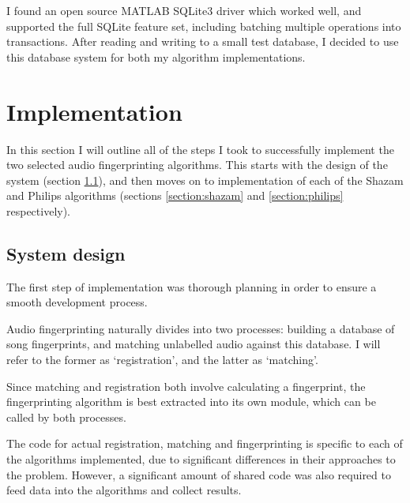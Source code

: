 \documentclass[12pt,a4paper,twoside,openright]{report}
\begin{document}
I found an open source MATLAB SQLite3 driver \cite{Yamaguchi14} which worked well, and supported the full SQLite feature set, including batching multiple operations into transactions. After reading and writing to a small test database, I decided to use this database system for both my algorithm implementations.





\chapter{Implementation}
\label{implementation}

In this section I will outline all of the steps I took to successfully implement the two selected audio fingerprinting algorithms. This starts with the design of the system (section \ref{section:systemdesign}), and then moves on to implementation of each of the Shazam and Philips algorithms (sections \ref{section:shazam} and \ref{section:philips} respectively).


\section{System design}
\label{section:systemdesign}

The first step of implementation was thorough planning in order to ensure a smooth development process. 

Audio fingerprinting naturally divides into two processes: building a database of song fingerprints, and matching unlabelled audio against this database. I will refer to the former as `registration', and the latter as `matching'.

Since matching and registration both involve calculating a fingerprint, the fingerprinting algorithm is best extracted into its own module, which can be called by both processes.

The code for actual registration, matching and fingerprinting is specific to each of the algorithms implemented, due to significant differences in their approaches to the problem. However, a significant amount of shared code was also required to feed data into the algorithms and collect results.
\end{document}
